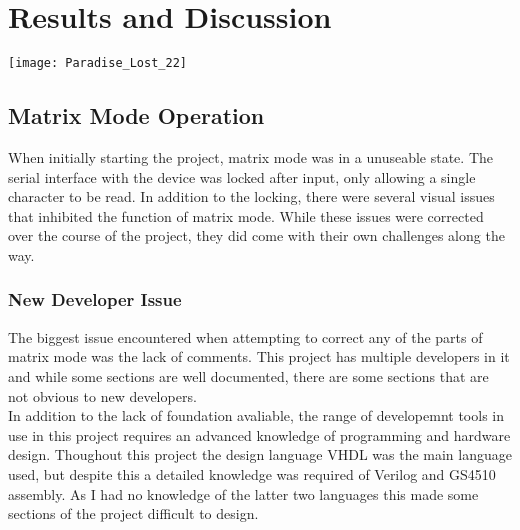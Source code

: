 
\chapter{Results and Discussion} %

\texttt{[image: Paradise\_Lost\_22]}

\label{Chapter 7} %


\section{Matrix Mode Operation}

When initially starting the project, matrix mode was in a unuseable state. The serial interface with the device was locked after input, only allowing a single character to be read. In addition to the locking, there were several visual issues that inhibited the function of matrix mode. While these issues were corrected over the course of the project, they did come with their own challenges along the way. 

\subsection{New Developer Issue}

The biggest issue encountered when attempting to correct any of the parts of matrix mode was the lack of comments. This project has multiple developers in it and while some sections are well documented, there are some sections that are not obvious to new developers.\\
In addition to the lack of foundation avaliable, the range of developemnt tools in use in this project requires an advanced knowledge of programming and hardware design. Thoughout this project the design language VHDL was the main language used, but despite this a detailed knowledge was required of Verilog and GS4510 assembly. As I had no knowledge of the latter two languages this made some sections of the project difficult to design.

